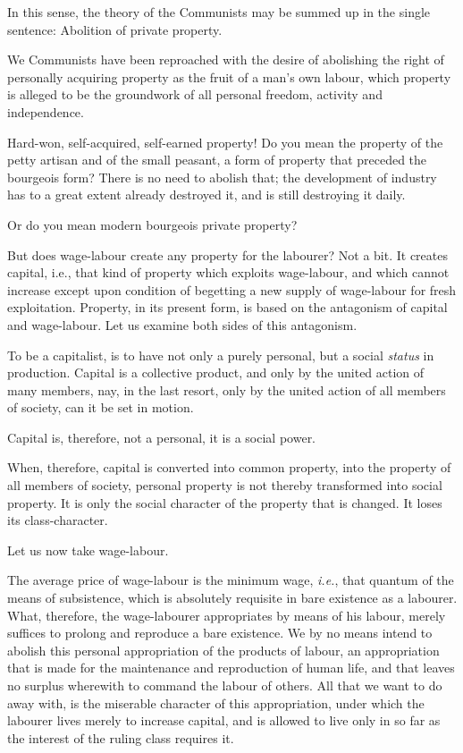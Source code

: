 In this sense, the theory of the Communists may be summed up in the
single sentence: Abolition of private property.

We Communists have been reproached with the desire of abolishing the
right of personally acquiring property as the fruit of a man’s own
labour, which property is alleged to be the groundwork of all personal
freedom, activity and independence.

Hard-won, self-acquired, self-earned property! Do you mean the property
of the petty artisan and of the small peasant, a form of property that
preceded the bourgeois form? There is no need to abolish that; the
development of industry has to a great extent already destroyed it, and
is still destroying it daily.

Or do you mean modern bourgeois private property?

But does wage-labour create any property for the labourer? Not a bit.
It creates capital, i.e., that kind of property which exploits
wage-labour, and which cannot increase except upon condition of
begetting a new supply of wage-labour for fresh exploitation. Property,
in its present form, is based on the antagonism of capital and
wage-labour. Let us examine both sides of this antagonism.

To be a capitalist, is to have not only a purely personal, but a social
\textit{status} in production. Capital is a collective product, and only by
the united action of many members, nay, in the last resort, only by the
united action of all members of society, can it be set in motion.

Capital is, therefore, not a personal, it is a social power.

When, therefore, capital is converted into common property, into the
property of all members of society, personal property is not thereby
transformed into social property. It is only the social character of
the property that is changed. It loses its class-character.

Let us now take wage-labour.

The average price of wage-labour is the minimum wage, \textit{i.e.}, that
quantum of the means of subsistence, which is absolutely requisite in
bare existence as a labourer. What, therefore, the wage-labourer
appropriates by means of his labour, merely suffices to prolong and
reproduce a bare existence. We by no means intend to abolish this
personal appropriation of the products of labour, an appropriation that
is made for the maintenance and reproduction of human life, and that
leaves no surplus wherewith to command the labour of others. All that
we want to do away with, is the miserable character of this
appropriation, under which the labourer lives merely to increase
capital, and is allowed to live only in so far as the interest of the
ruling class requires it.

